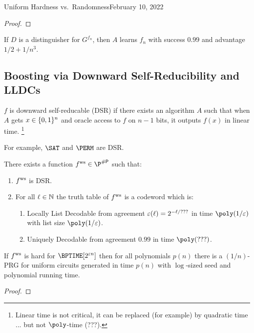 \begin{lecture}{4}{Uniform Hardness vs.\ Randomness}{February 10, 2022}
\begin{proof}
\end{proof}

\begin{proposition}
	If $D$ is a distinguisher for $G^{f_n}$, then $A$ learns $f_n$ with success
	$0.99$ and advantage $1/2 + 1/n^3$.
\end{proposition}

\subsection{Boosting via Downward Self-Reducibility and LLDCs}

\begin{definition}
	$f$ is downward self-reducable (DSR) if there exists an algorithm $A$
	such that when $A$ gets $x \in \{0, 1\}^n$ and oracle access to $f$
	on $n - 1$ bits, it outputs $f(x)$ in linear time.%
	\footnote{Linear time is not critical, it can be replaced (for example)
	by quadratic time ... but not $\poly$-time (???).}
\end{definition}

For example, $\SAT$ and $\PERM$ are DSR.

\begin{proposition}
	There exists a function $\fws \in \P^{\sharpp}$ such that:
	\begin{enumerate}
		\item $ f^{\text{ws}} $ is DSR.
		\item For all $\ell \in \mathbb{N}$ the truth table of $ f^{\text{ws}} $ is a codeword
			which is:
			\begin{enumerate}
				\item Locally List Decodable from agreement
					$\varepsilon(\ell) = 2^{-\ell / ???}$ in time $\poly(1/\eps)$
					with list size $\poly(1 / \eps)$.
				\item Uniquely Decodable from agreement $0.99$ in time
					$\poly(???)$.
			\end{enumerate}
	\end{enumerate}
\end{proposition}

\begin{theorem}
	If
	$ f^{\text{ws}} $ is hard for $\BPTIME\brac{2^{\eps n}}$
	then
	for all polynomials $p(n)$ there is a $(1 / n)$-PRG for uniform circuits
	generated in time $p(n)$ with $\log$-sized seed and polynomial running
	time.
\end{theorem}

\begin{proof}
\end{proof}

\end{lecture}
